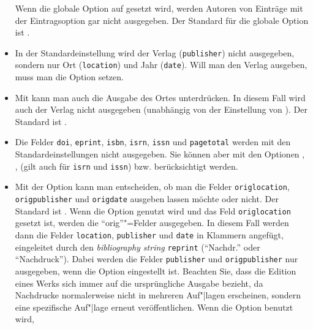 \documentclass[ngerman]{scrartcl}
\begin{document}
\begin{itemize}
\begin{lstlisting}
				\end{lstlisting}
				Wenn die globale Option  auf  gesetzt wird, werden Autoren
				von Einträge mit der Eintragsoption  gar nicht ausgegeben. Der Standard für
				die globale Option ist .
  \item In
	      der Standardeinstellung wird der Verlag (\texttt{publisher}) nicht
        ausgegeben, sondern nur Ort (\texttt{location}) und Jahr 
        (\texttt{date}). Will man den Verlag ausgeben, muss man die Option 
         setzen.
  \item Mit
	       kann man auch die Ausgabe des Ortes 
        unterdrücken. In diesem Fall wird auch der Verlag nicht ausgegeben 
        (unabhängig von der
        Einstellung von ). Der Standard ist .
  \item Die Felder \texttt{doi}, \texttt{eprint}, \texttt{isbn}, \texttt{isrn},
	      \texttt{issn} und \texttt{pagetotal} werden mit den Standardeinstellungen 
        nicht ausgegeben. Sie können aber mit den Optionen ,
        ,  (gilt auch für \texttt{isrn}
				und \texttt{issn}) bzw.  berücksichtigt werden.
  \item Mit
	      der Option  kann man entscheiden, ob man die 
        Felder \texttt{origlocation}, \texttt{origpublisher} und 
        \texttt{origdate} ausgeben lassen möchte oder nicht. Der Standard ist 
        . Wenn die Option genutzt wird und das Feld 
        \texttt{origlocation} gesetzt ist, werden die \enquote{orig}"=Felder 
        ausgegeben. In diesem Fall werden dann die Felder \texttt{location}, 
        \texttt{publisher} und \texttt{date} in Klammern angefügt, eingeleitet 
        durch den \emph{bibliography string} \texttt{reprint} (\enquote{Nachdr.} oder 
        \enquote{Nachdruck}). Dabei werden die Felder \texttt{publisher} und 
        \texttt{origpublisher} nur ausgegeben,
        wenn die Option  eingestellt ist.
        \achtung Beachten Sie, dass die Edition eines Werks sich immer auf die
        ursprüngliche Ausgabe bezieht, da Nachdrucke normalerweise nicht in 
        mehreren Auf"|lagen erscheinen, sondern eine spezifische Auf"|lage 
        erneut veröffentlichen. Wenn die Option  benutzt wird,

\end{itemize}
\end{document}
